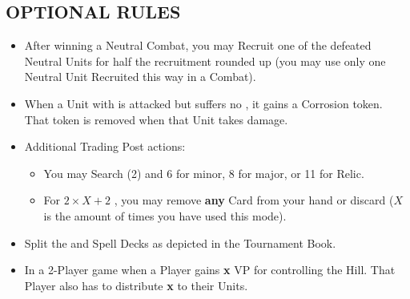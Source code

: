 \begin{multicols}{2}
\subsection*{\MakeUppercase{Optional Rules}}
\begin{itemize}
  \item After winning a Neutral Combat, you may Recruit one of the defeated Neutral Units for half the recruitment  rounded up (you may use only one Neutral Unit Recruited this way in a Combat).  %
  \item When a Unit with  is attacked but suffers no , it gains a Corrosion token. That token is removed when that Unit takes damage.
  \item Additional Trading Post actions:
  \begin{itemize}
    \item You may Search (2)  and  6  for minor, 8  for major, or 11  for Relic.
    \item For $2×X+2$ , you may remove \textbf{any} Card from your hand or discard ($X$is the amount of times you have used this mode).
  \end{itemize}
  \item Split the  and Spell Decks as depicted in the Tournament Book.
  \item In a 2-Player game when a Player gains \textbf{x} VP for controlling the Hill. That Player also has to distribute \textbf{x}  to their Units.
\end{itemize}

\end{multicols}

